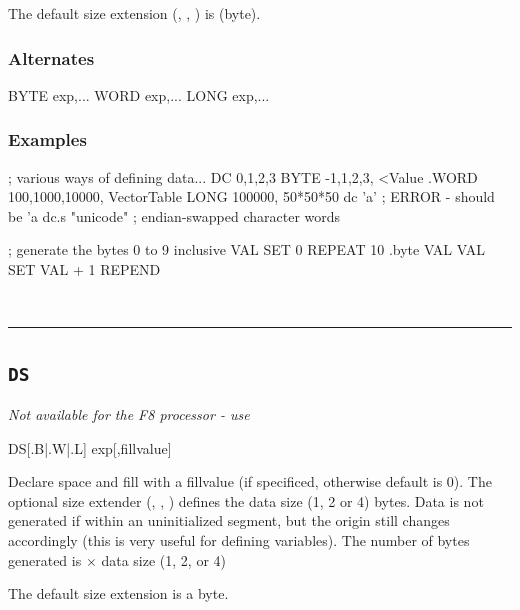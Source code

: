 The default size extension (, , ) is  (byte).

\subsubsection{Alternates}
\begin{usage}
   BYTE exp,...
   WORD exp,...
   LONG exp,...
\end{usage}

\subsubsection{Examples}

\begin{code}[caption=Data Generation]
; various ways of defining data...
  DC 0,1,2,3
  BYTE -1,1,2,3, <Value
  .WORD 100,1000,10000, VectorTable
  LONG 100000, 50*50*50
  dc 'a'  ; ERROR - should be 'a
  dc.s "unicode"   ; endian-swapped character words
\end{code}

\begin{code}[caption=Data Declaration using REPEAT Loop]
; generate the bytes 0 to 9 inclusive
VAL SET 0
    REPEAT 10
        .byte VAL
VAL SET VAL + 1
    REPEND
\end{code}\\




\hrule
\subsection{\texttt{DS}}
\label{pseudoop:ds}

\emph{Not available for the F8 processor - use }

\begin{usage}
  DS[{.B|.W|.L}] exp[,fillvalue]
\end{usage}

Declare space and fill with a fillvalue (if specificed, otherwise default is 0). The optional size extender (, , ) defines the data size (1, 2 or 4) bytes. Data is not generated if within an uninitialized segment, but the origin still changes accordingly (this is very useful for defining variables).  The number of bytes generated is  $\times$ data size (1, 2, or 4)

The default size extension is a byte.


